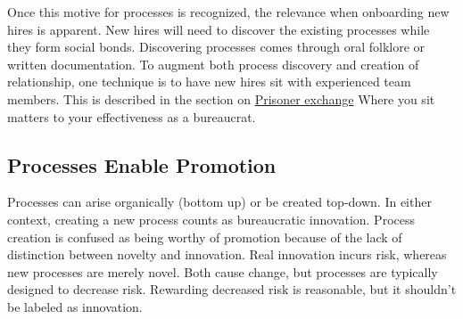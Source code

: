 Once this motive for processes is recognized, the relevance when onboarding new hires is apparent. New hires will need to discover the existing processes while they form social bonds. Discovering processes comes through oral folklore or written documentation. To augment both process discovery and creation of relationship, one technique is to have new hires sit with experienced team members.
This is described in the section on  
\hyperref[sec:prisoner-exchange]{Prisoner exchange}\iftoggle{haspagenumbers}{ on 
page~\pageref{sec:prisoner-exchange}.}{.}
Where you sit matters to your effectiveness as a bureaucrat.

\subsection*{Processes Enable Promotion}

Processes can arise organically (bottom up) or be created top-down. In either context, creating a new process counts as bureaucratic innovation. Process creation is confused as being worthy of promotion because of the lack of distinction between novelty and innovation. Real innovation incurs risk, whereas new processes are merely novel. Both cause change, but processes are typically designed to decrease risk. Rewarding decreased risk is reasonable, but it shouldn't be labeled as innovation.

